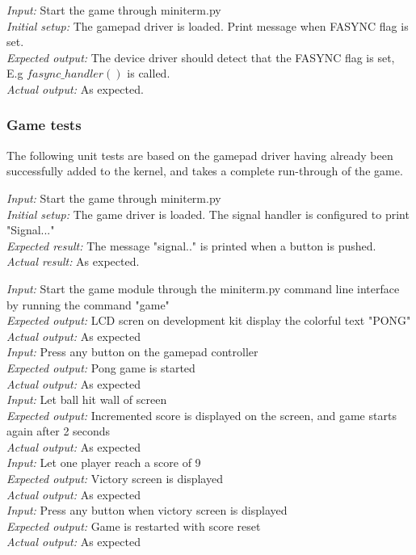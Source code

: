 \emph{Input: } Start the game through miniterm.py  \\
\emph{Initial setup: } The gamepad driver is loaded. Print message when FASYNC flag is set.\\
\emph{Expected output: } The device driver should detect that the FASYNC flag is set, E.g $fasync\_handler()$ is called.\\ 
\emph{Actual output: } As expected. \\




\subsubsection{Game tests}

The following unit tests are based on the gamepad driver having already been successfully added to the kernel, and takes a complete run-through of the game.

\emph{Input: } Start the game through miniterm.py\\
\emph{Initial setup: } The game driver is loaded. The signal handler is configured to print "Signal..."\\
\emph{Expected result: } The message "signal.." is printed when a button is pushed. \\
\emph{Actual result: } As expected. 

\emph{Input: } Start the game module through the miniterm.py command line interface by running the command "game"\\
\emph{Expected output: } LCD scren on development kit display the colorful text "PONG"\\
\emph{Actual output: } As expected \\

\emph{Input: } Press any button on the gamepad controller\\
\emph{Expected output: } Pong game is started\\
\emph{Actual output: } As expected \\

\emph{Input: } Let ball hit wall of screen\\
\emph{Expected output: } Incremented score is displayed on the screen, and game starts again after 2 seconds\\
\emph{Actual output: } As expected \\

\emph{Input: } Let one player reach a score of 9\\
\emph{Expected output: } Victory screen is displayed\\
\emph{Actual output: } As expected \\

\emph{Input: } Press any button when victory screen is displayed\\
\emph{Expected output: } Game is restarted with score reset\\
\emph{Actual output: } As expected \\